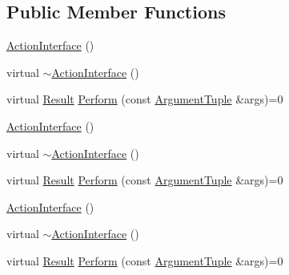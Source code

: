 \subsection*{Public Member Functions}
\begin{DoxyCompactItemize}
\item 
\mbox{\hyperlink{classtesting_1_1_action_interface_a0f1d44e4c669a9cae5ee5b28419a6f52}{Action\+Interface}} ()
\item 
virtual \mbox{\hyperlink{classtesting_1_1_action_interface_a7dd0a5fc93d86ae3c9d04963b9f3a93f}{$\sim$\+Action\+Interface}} ()
\item 
virtual \mbox{\hyperlink{classtesting_1_1_action_interface_a7477de2fe3e4e01c59db698203acaee7}{Result}} \mbox{\hyperlink{classtesting_1_1_action_interface_a20f8624fcea1786f2992b358760422a0}{Perform}} (const \mbox{\hyperlink{classtesting_1_1_action_interface_af72720d864da4d606629e83edc003511}{Argument\+Tuple}} \&args)=0
\item 
\mbox{\hyperlink{classtesting_1_1_action_interface_a0f1d44e4c669a9cae5ee5b28419a6f52}{Action\+Interface}} ()
\item 
virtual \mbox{\hyperlink{classtesting_1_1_action_interface_a7dd0a5fc93d86ae3c9d04963b9f3a93f}{$\sim$\+Action\+Interface}} ()
\item 
virtual \mbox{\hyperlink{classtesting_1_1_action_interface_a7477de2fe3e4e01c59db698203acaee7}{Result}} \mbox{\hyperlink{classtesting_1_1_action_interface_a20f8624fcea1786f2992b358760422a0}{Perform}} (const \mbox{\hyperlink{classtesting_1_1_action_interface_af72720d864da4d606629e83edc003511}{Argument\+Tuple}} \&args)=0
\item 
\mbox{\hyperlink{classtesting_1_1_action_interface_a0f1d44e4c669a9cae5ee5b28419a6f52}{Action\+Interface}} ()
\item 
virtual \mbox{\hyperlink{classtesting_1_1_action_interface_a7dd0a5fc93d86ae3c9d04963b9f3a93f}{$\sim$\+Action\+Interface}} ()
\item 
virtual \mbox{\hyperlink{classtesting_1_1_action_interface_a7477de2fe3e4e01c59db698203acaee7}{Result}} \mbox{\hyperlink{classtesting_1_1_action_interface_a20f8624fcea1786f2992b358760422a0}{Perform}} (const \mbox{\hyperlink{classtesting_1_1_action_interface_af72720d864da4d606629e83edc003511}{Argument\+Tuple}} \&args)=0
\end{DoxyCompactItemize}
